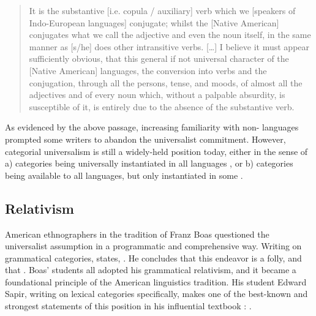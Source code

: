 \blockquote[{\cite[175--176]{Gallatin1836}}]{It is the substantive [i.e. copula / auxiliary] verb which we [speakers of Indo-European languages] conjugate; whilst the [Native American] conjugates what we call the adjective and even the noun itself, in the same manner as [s/he] does other intransitive verbs. […] I believe it must appear sufficiently obvious, that this general if not universal character of the [Native American] languages, the conversion into verbs and the conjugation, through all the persons, tense, and moods, of almost all the adjectives and of every noun which, without a palpable absurdity, is susceptible of it, is entirely due to the absence of the substantive verb.}

As evidenced by the above passage, increasing familiarity with non- languages prompted some writers to abandon the universalist commitment. However, categorial universalism is still a widely-held position today, either in the sense of a) categories being universally instantiated in all languages , or b) categories being available to all languages, but only instantiated in some .

\subsection{Relativism}
\label{sec:2.2.2}

American ethnographers in the tradition of Franz Boas questioned the universalist assumption in a programmatic and comprehensive way. Writing on grammatical categories, \citeauthor{Boas1911} states, . He concludes that this endeavor is a folly, and that . Boas' students all adopted his grammatical relativism, and it became a foundational principle of the American linguistics tradition. His student Edward Sapir, writing on lexical categories specifically, makes one of the best-known and strongest statements of this position in his influential textbook : .

